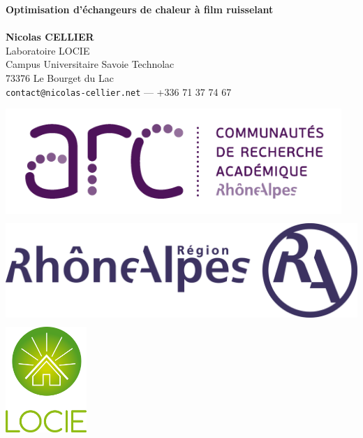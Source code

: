 \documentclass[a0,portrait,11pt]{a0poster}
\begin{document}


\begin{minipage}[b]{0.5\linewidth}
\veryHuge \color{NavyBlue} \textbf{Optimisation d'échangeurs de chaleur à film ruisselant} \color{Black}\\ %
\Huge\textit{}\\[2cm] %
\huge \textbf{Nicolas CELLIER}\\[0.5cm] %
\huge Laboratoire LOCIE\\
Campus Universitaire Savoie Technolac\\
73376 Le Bourget du Lac\\[0.4cm] %
\Large \texttt{contact@nicolas-cellier.net} --- +336 71 37 74 67\\
\end{minipage}
%
\begin{minipage}[b]{0.5\linewidth}
\begin{flushright}
	\includegraphics[height=4cm]{logo-arc-72dpi}
  \hspace{1cm}
  \includegraphics[height=4cm]{logo_ra}
	\hspace{1cm}
	\includegraphics[height=4cm]{locie-logo}
\end{flushright}
\vspace{10cm}
\end{minipage}
\end{document}
